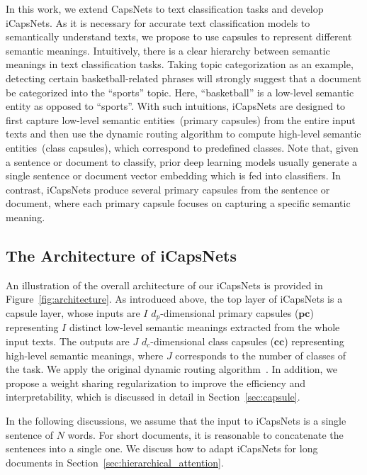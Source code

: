 \documentclass[10pt,journal,compsoc]{IEEEtran}
\begin{document}
In this work, we extend CapsNets to text classification tasks and develop iCapsNets. As it is necessary for accurate text classification models to semantically understand texts, we propose to use capsules to represent different semantic meanings. Intuitively, there is a clear hierarchy between semantic meanings in text classification tasks. Taking topic categorization as an example, detecting certain basketball-related phrases will strongly suggest that a document be categorized into the ``sports'' topic. Here, ``basketball'' is a low-level semantic entity as opposed to ``sports''. With such intuitions, iCapsNets are designed to first capture low-level semantic entities~(primary capsules) from the entire input texts and then use the dynamic routing algorithm to compute high-level semantic entities~(class capsules), which correspond to predefined classes. Note that, given a sentence or document to classify, prior deep learning models usually generate a single sentence or document vector embedding which is fed into classifiers. In contrast, iCapsNets produce several primary capsules from the sentence or document, where each primary capsule focuses on capturing a specific semantic meaning.

\subsection{The Architecture of iCapsNets}\label{sec:architecture}

An illustration of the overall architecture of our iCapsNets is provided in Figure~\ref{fig:architecture}. As introduced above, the top layer of iCapsNets is a capsule layer, whose inputs are $I$ $d_p$-dimensional primary capsules ($\mathbf{pc}$) representing $I$ distinct low-level semantic meanings extracted from the whole input texts. The outputs are $J$ $d_c$-dimensional class capsules ($\mathbf{cc}$) representing high-level semantic meanings, where $J$ corresponds to the number of classes of the task. We apply the original dynamic routing algorithm~\cite{sabour2017dynamic}. In addition, we propose a weight sharing regularization to improve the efficiency and interpretability, which is discussed in detail in Section~\ref{sec:capsule}.

In the following discussions, we assume that the input to iCapsNets is a single sentence of $N$ words. For short documents, it is reasonable to concatenate the sentences into a single one. We discuss how to adapt iCapsNets for long documents in Section~\ref{sec:hierarchical_attention}.
\end{document}
